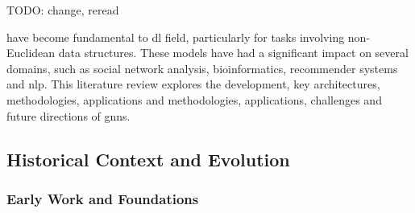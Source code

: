 TODO: change, reread

 have become fundamental to \acrlong{dl} field, particularly for tasks involving non-Euclidean data structures. These models have had a significant impact on several domains, such as social network analysis, bioinformatics, recommender systems and \gls{nlp}. This literature review explores the development, key architectures, methodologies, applications and
methodologies, applications, challenges and future directions of \glspl{gnn}.

\subsection*{Historical Context and Evolution}

\subsubsection*{Early Work and Foundations}

